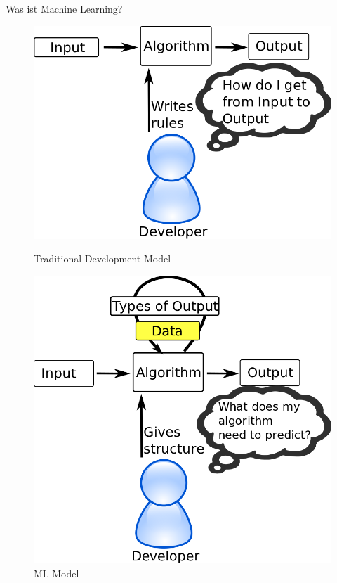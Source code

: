\documentclass{beamer}
\begin{document}
\begin{frame}{Was ist Machine Learning?}
    \begin{figure}[ht]
        \begin{minipage}[b]{0.45\linewidth}
            \centering
            \includegraphics[width=\textwidth]{../images/traditional-model.png}
            \caption{Traditional Development Model}
        \end{minipage}
        \hspace{0.5cm}
        \begin{minipage}[b]{0.45\linewidth}
            \centering
            \includegraphics[width=\textwidth]{../images/ml-model.png}
            \caption{ML Model}
        \end{minipage}
    \end{figure}
\end{frame}
\end{document}
